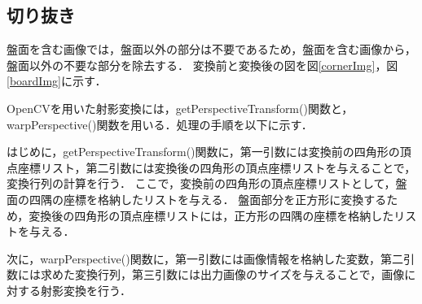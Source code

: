\documentclass[openright]{nitocs}
\numberwithin{equation}{section}
\begin{document}
        \subsection{切り抜き}
        \label{boardCut}
            盤面を含む画像では，盤面以外の部分は不要であるため，盤面を含む画像から，盤面以外の不要な部分を除去する．
            変換前と変換後の図を図\ref{cornerImg}，図\ref{boardImg}に示す．

            OpenCVを用いた射影変換には，getPerspectiveTransform()関数と，warpPerspective()関数を用いる．処理の手順を以下に示す．

            はじめに，getPerspectiveTransform()関数に，第一引数には変換前の四角形の頂点座標リスト，第二引数には変換後の四角形の頂点座標リストを与えることで，変換行列の計算を行う．
            ここで，変換前の四角形の頂点座標リストとして，盤面の四隅の座標を格納したリストを与える．
            盤面部分を正方形に変換するため，変換後の四角形の頂点座標リストには，正方形の四隅の座標を格納したリストを与える．

            次に，warpPerspective()関数に，第一引数には画像情報を格納した変数，第二引数には求めた変換行列，第三引数には出力画像のサイズを与えることで，画像に対する射影変換を行う．
\end{document}
